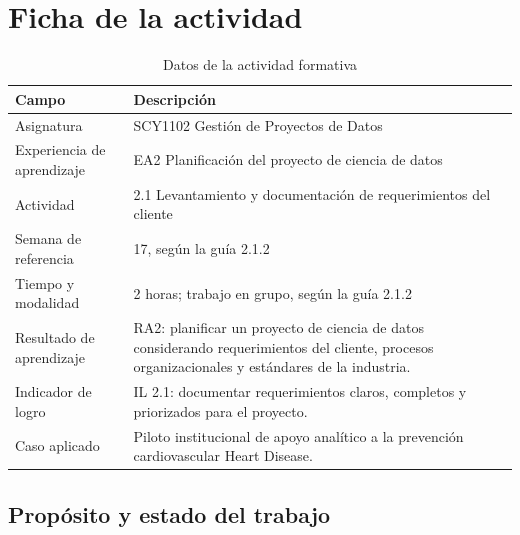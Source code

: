 \documentclass[12pt,a4paper]{article}
\begin{document}
\begin{center}\end{center}
\hypersetup{pageanchor=false}

\hypersetup{pageanchor=true}
\tableofcontents
\clearpage
{}

\section{Ficha de la actividad}

\begin{table}[H]
  \centering
  \caption{Datos de la actividad formativa}
  \label{tab:act1-ficha}
  \small
  \begin{tabularx}{\textwidth}{@{}lX@{}}
    \toprule
    Campo & Descripción \\
    \midrule
    Asignatura & SCY1102 Gestión de Proyectos de Datos \\
    Experiencia de aprendizaje & EA2 Planificación del proyecto de ciencia de datos \\
    Actividad & 2.1 Levantamiento y documentación de requerimientos del cliente \\
    Semana de referencia & 17, según la guía 2.1.2 \\
    Tiempo y modalidad & 2 horas; trabajo en grupo, según la guía 2.1.2 \\
    Resultado de aprendizaje & RA2: planificar un proyecto de ciencia de datos considerando requerimientos del cliente, procesos organizacionales y estándares de la industria. \\
    Indicador de logro & IL 2.1: documentar requerimientos claros, completos y priorizados para el proyecto. \\
    Caso aplicado & Piloto institucional de apoyo analítico a la prevención cardiovascular Heart Disease. \\
    \bottomrule
  \end{tabularx}
\end{table}

\subsection{Propósito y estado del trabajo}
\end{document}
